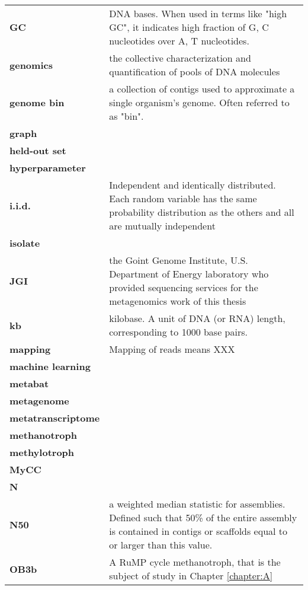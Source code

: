 \begin{singlespace}
\begin{longtable}{ p{}  p{} }
\textbf{GC} & DNA bases.  When used in terms like "high GC", it indicates high fraction of G, C nucleotides over A, T nucleotides. \\
\textbf{genomics} & the collective characterization and quantification of pools of DNA molecules \\
\textbf{genome bin} & a collection of contigs used to approximate a single organism's genome.  Often referred to as "bin". \\
\textbf{graph} &  \\
\textbf{held-out set} &  \\
\textbf{hyperparameter} &  \\
\textbf{i.i.d.} & Independent and identically distributed.
    Each random variable has the same probability distribution as the others and all are mutually independent \\
\textbf{isolate} & \\
\textbf{JGI} & the Goint Genome Institute, U.S. Department of Energy laboratory who provided sequencing services for the metagenomics work of this thesis \\
\textbf{kb} & kilobase. A unit of DNA (or RNA) length, corresponding to 1000 base pairs. \\
\textbf{mapping} & Mapping of reads means XXX \\
\textbf{machine learning} &  \\
\textbf{metabat} &  \\
\textbf{metagenome} &  \\
\textbf{metatranscriptome} &  \\
\textbf{methanotroph} &  \\
\textbf{methylotroph} &  \\
\textbf{MyCC} &  \\
\textbf{N} &  \\
\textbf{N50} & a weighted median statistic for assemblies.  %
    Defined such that 50\% of the entire assembly is contained in contigs or scaffolds equal to or larger than this value. \\
\textbf{OB3b} & A RuMP cycle methanotroph, that is the subject of study in Chapter \ref{chapter:A}  \\

\end{longtable}
\end{singlespace}
